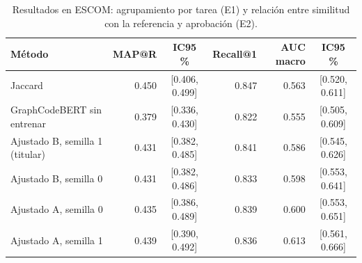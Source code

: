 \begin{table}[H]
\centering
\small
\begin{tabular}{|l|r|c|r|r|c|}
\hline
\textbf{Método} & \textbf{MAP@R} & \textbf{IC95 \%} & \textbf{Recall@1} & \textbf{AUC macro} & \textbf{IC95 \%} \\ \hline
Jaccard & 0.450 & [0.406, 0.499] & 0.847 & 0.563 & [0.520, 0.611] \\ \hline
GraphCodeBERT sin entrenar & 0.379 & [0.336, 0.430] & 0.822 & 0.555 & [0.505, 0.609] \\ \hline
Ajustado B, semilla 1 (titular) & 0.431 & [0.382, 0.485] & 0.841 & 0.586 & [0.545, 0.626] \\ \hline
Ajustado B, semilla 0 & 0.431 & [0.382, 0.486] & 0.833 & 0.598 & [0.553, 0.641] \\ \hline
Ajustado A, semilla 0 & 0.435 & [0.386, 0.489] & 0.839 & 0.600 & [0.553, 0.651] \\ \hline
Ajustado A, semilla 1 & 0.439 & [0.390, 0.492] & 0.836 & 0.613 & [0.561, 0.666] \\ \hline
\end{tabular}
\caption{Resultados en ESCOM: agrupamiento por tarea (E1) y relación entre similitud con la referencia y aprobación (E2).}
\label{tab:resultados_e1_e2}
\end{table}
